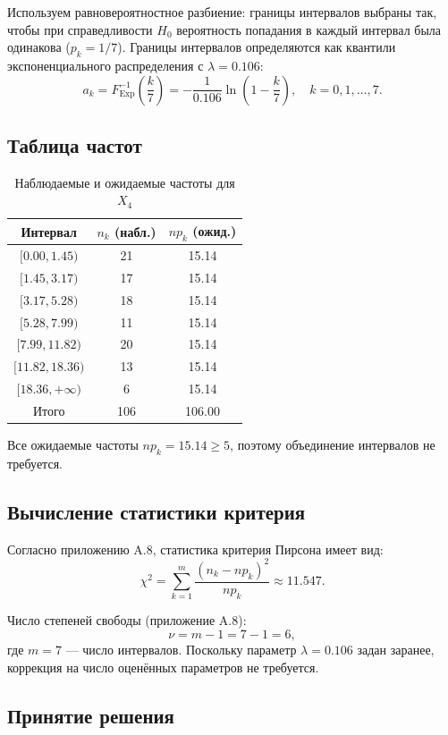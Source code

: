 Используем равновероятностное разбиение: границы интервалов выбраны так, чтобы при справедливости \(H_0\) вероятность попадания в каждый интервал была одинакова (\(p_k = 1/7\)). Границы интервалов определяются как квантили экспоненциального распределения с \(\lambda = 0.106\):
\[
a_k = F^{-1}_{\text{Exp}}\left(\frac{k}{7}\right) = -\frac{1}{0.106} \ln\left(1 - \frac{k}{7}\right), \quad k = 0, 1, \dots, 7.
\]

\subsection{Таблица частот}

\begin{table}[H]
\centering
\caption{Наблюдаемые и ожидаемые частоты для \(X_4\)}
\label{tab:chi2}
\begin{tabular}{ccc}
\toprule
Интервал & \(n_k\) (набл.) & \(np_k\) (ожид.) \\
\midrule
\([0.00, 1.45)\) & 21 & 15.14 \\
\([1.45, 3.17)\) & 17 & 15.14 \\
\([3.17, 5.28)\) & 18 & 15.14 \\
\([5.28, 7.99)\) & 11 & 15.14 \\
\([7.99, 11.82)\) & 20 & 15.14 \\
\([11.82, 18.36)\) & 13 & 15.14 \\
\([18.36, +\infty)\) & 6 & 15.14 \\
\midrule
Итого & 106 & 106.00 \\
\bottomrule
\end{tabular}
\end{table}

Все ожидаемые частоты \(np_k = 15.14 \geq 5\), поэтому объединение интервалов не требуется.

\subsection{Вычисление статистики критерия}

Согласно приложению A.8, статистика критерия Пирсона имеет вид:
\[
\chi^2 = \sum_{k=1}^{m} \frac{(n_k - np_k)^2}{np_k} \approx 11.547.
\]

Число степеней свободы (приложение A.8):
\[
\nu = m - 1 = 7 - 1 = 6,
\]
где \(m = 7\) — число интервалов. Поскольку параметр \(\lambda = 0.106\) задан заранее, коррекция на число оценённых параметров не требуется.

\subsection{Принятие решения}

